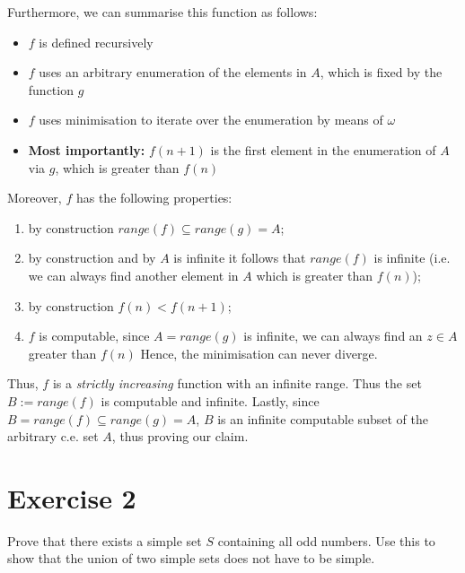 \documentclass[11pt,a4paper]{article}
\begin{document}
Furthermore, we can summarise this function as follows:
\begin{itemize}
\item $f$ is defined recursively
\item $f$ uses an arbitrary enumeration of the elements in $A$, which is fixed by the function $g$
\item $f$ uses minimisation to iterate over the enumeration by means of $\omega$
\item \textbf{Most importantly:} $f(n+1)$ is the first element in the enumeration of $A$ via $g$, which is greater than $f(n)$
\end{itemize}


Moreover, $f$ has the following properties:
\begin{enumerate}
\item by construction $range(f) \subseteq range(g) = A$;
\item by construction and by $A$ is infinite it follows that $range(f)$ is infinite
(i.e. we can always find another element in $A$ which is greater than $f(n)$);
\item by construction $f(n) < f(n+1)$;
\item $f$ is computable, since $A=range(g)$ is infinite, we can always find an $z \in A$ greater than $f(n)$ 
Hence, the minimisation can never diverge. 
\end{enumerate}
Thus, $f$ is a \emph{strictly increasing} function with an infinite range. Thus the set $B:=range(f)$
is computable and infinite. Lastly, since $B=range(f) \subseteq range(g)=A$, $B$ is an infinite computable subset of 
the arbitrary c.e. set $A$, thus proving our claim.


\section*{Exercise 2}
Prove that there exists a simple set $S$ containing all odd numbers. Use this to show
that the union of two simple sets does not have to be simple. \\
\end{document}
